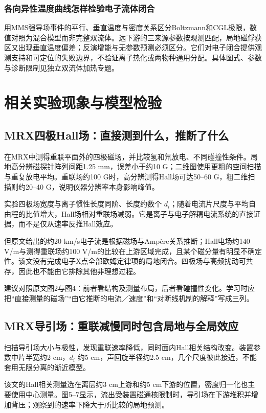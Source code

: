 \documentclass[UTF8,a4paper,11pt,openany,fontset=fandol]{ctexbook}
\begin{document}
\subsection{各向异性温度曲线怎样检验电子流体闭合}
\citet{Wetherton2019}用MMS强导场事件的平行、垂直温度与密度关系区分Boltzmann和CGL极限，数值对照为混合模型而非完整双流体。\citet{Wetherton2021}远下游的三来源参数按观测匹配，局地磁俘获区又出现垂直温度偏差；反演增能与无参数预测必须区分。它们对电子闭合提供观测支持和可定位的失败边界，不验证离子热化或两物种通用分配。具体图式、参数与诊断限制见独立双流体加热专题。



\chapter{相关实验现象与模型检验}
\section{MRX四极Hall场：直接测到什么，推断了什么}
\citet{Ren2005}在MRX中测得重联平面外的四极磁场，并比较氢和氘放电、不同碰撞性条件。局地高分辨磁探针阵列间距1.25 mm，误差小于约10 G；二维图使用更粗的空间扫描与重复放电平均。重联场约100 G时，高分辨测得Hall场可达50--60 G，粗二维扫描则约20--40 G，说明仪器分辨率本身影响峰值。

实验四极场宽度与离子惯性长度同阶、长度约数个 $d_i$；随着电流片尺度与平均自由程的比值增大，Hall场相对重联场减弱。它是离子与电子解耦电流系统的直接证据，而不是仅从速率反推Hall效应。

但原文给出的约20 km/s电子流是根据磁场与Ampère关系推断；Hall电场约140 V/m与测得重联场约100 V/m的比较在上游区域完成，且某个磁分量有明显不确定性。该文没有完成电子X点全部欧姆定律项的局地闭合。四极场与高频扰动可共存，因此也不能由它排除其他非理想过程。

建议对照原文图2与图4：前者看结构及测量布局，后者看碰撞性变化。学习时应把“直接测量的磁场”“由它推断的电流／速度”和“对断线机制的解释”写成三列。

\section{MRX导引场：重联减慢同时包含局地与全局效应}
\citet{GuideExp2012}扫描导引场大小与极性，发现重联速率降低，同时面内Hall相关结构改变。装置参数中片半宽约2 cm，$d_i$ 约5 cm，声回旋半径约2.5 cm，几个尺度彼此接近，不能套用无限分离的渐近模型。

该文的Hall相关测量选在离层约3 cm上游和约5 cm下游的位置，密度归一化也主要使用中心测量。图5--7显示，流出受装置磁通核限制时，导引场在下游堆积并增加背压；观察到的速率下降大于所比较的局地预测。
\end{document}
